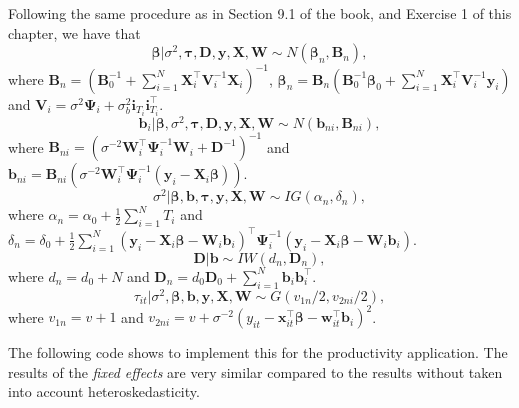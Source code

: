 \begin{enumerate}[leftmargin=*]
Following the same procedure as in Section 9.1 of the book, and Exercise 1 of this chapter, we have that
\begin{equation*}
	\bm{\beta}|\sigma^2,\bm{\tau},\bm{D},\bm{y}, \bm{X}, \bm{W} \sim {N}(\bm{\beta}_n,\bm{B}_n), 
\end{equation*}
where $\bm{B}_n = (\bm{B}_0^{-1} +\sum_{i=1}^N \bm{X}_i^{\top}\bm{V}_i^{-1}\bm{X}_i)^{-1}$, $\bm{\beta}_n= \bm{B}_n(\bm{B}_0^{-1}\bm{\beta}_0 + \sum_{i=1}^N\bm{X}_i^{\top}\bm{V}_i^{-1}\bm{y}_i)$ and $\bm{V}_i=\sigma^2\bm{\Psi}_i+\sigma_{b}^2\bm{i}_{T_i}\bm{i}_{T_i}^{\top}$.
\begin{equation*}
	\bm{b}_i|\bm{\beta},\sigma^2,\bm{\tau},\bm{D},\bm{y}, \bm{X}, \bm{W} \sim {N}(\bm{b}_{ni},\bm{B}_{ni}), 
\end{equation*} 
where $\bm{B}_{ni}=(\sigma^{-2}\bm{W}_i^{\top}\bm{\Psi}_i^{-1}\bm{W}_i+\bm{D}^{-1})^{-1}$ and $\bm{b}_{ni}=\bm{B}_{ni}(\sigma^{-2}\bm{W}_i^{\top}\bm{\Psi}_i^{-1}(\bm{y}_i-\bm{X}_i\bm{\beta}))$.
\begin{equation*}
	\sigma^2| \bm{\beta}, \bm{b}, \bm{\tau}, \bm{y}, \bm{X}, \bm{W} \sim {I}{G}(\alpha_n, \delta_n),
\end{equation*}
where $\alpha_n=\alpha_0+\frac{1}{2}\sum_{i=1}^N T_i$ and $\delta_n=\delta_0+\frac{1}{2}\sum_{i=1}^N(\bm{y}_i-\bm{X}_i\bm{\beta}-\bm{W}_i\bm{b}_i)^{\top}\bm{\Psi}_i^{-1}(\bm{y}_i-\bm{X}_i\bm{\beta}-\bm{W}_i\bm{b}_i)$.  
\begin{equation*}
	\bm{D}| \bm{b} \sim {I}{W}(d_n, \bm{D}_n),
\end{equation*}
where $d_n=d_0+N$ and $\bm{D}_n=d_0\bm{D}_0+\sum_{i=1}^N\bm{b}_i\bm{b}_i^{\top}$.
\begin{equation*}
	\tau_{it}|\sigma^2, \bm{\beta}, \bm{b}, \bm{y}, \bm{X}, \bm{W} \sim {G}(v_{1n}/2, v_{2ni}/2),
\end{equation*}
where $v_{1n}=v+1$ and $v_{2ni}=v+\sigma^{-2}(y_{it}-\bm{x}_{it}^{\top}\bm{\beta}-\bm{w}_{it}^{\top}\bm{b}_i)^2$.

The following code shows to implement this for the productivity application. The results of the \textit{fixed effects} are very similar compared to the results without taken into account heteroskedasticity. 


\end{enumerate}
